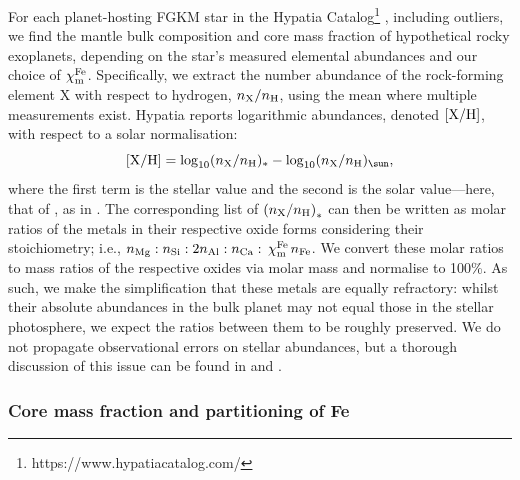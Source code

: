 \documentclass[fleqn,usenatbib]{mnras}
\newcommand{\coreeff}{$\chi^{\rm Fe}_{\rm m}$}
\begin{document}
For each planet-hosting FGKM star in the Hypatia Catalog\footnote{https://www.hypatiacatalog.com/} \citep{hinkel_stellar_2014}, including outliers, we find the mantle bulk composition and core mass fraction of hypothetical rocky exoplanets, depending on the star's measured elemental abundances and our choice of \coreeff. Specifically, we extract the number abundance of the rock-forming element X with respect to hydrogen, $n_{\rm X}/n_{\rm H}$, using the mean where multiple measurements exist. Hypatia reports logarithmic abundances, denoted ${\rm [X/H]}$, with respect to a solar normalisation:
\begin{equation}
    {\rm [X/H]} = \log_{10}(n_{\rm X}/n_{\rm H})_* - \log_{10}(n_{\rm X}/n_{\rm H})_{\sun},
\end{equation}
where the first term is the stellar value and the second is the solar value---here, that of \citet{lodders_abundances_2009}, as in \citet{hinkel_starplanet_2018}. The corresponding list of $\left(n_{\rm X}/n_{\rm H}\right)_*$ can then be written as molar ratios of the metals in their respective oxide forms considering their stoichiometry; i.e., $n_{\rm Mg}:n_{\rm Si}:2n_{\rm Al}:n_{\rm Ca}:$ \coreeff$n_{\rm Fe}$. We convert these molar ratios to mass ratios of the respective oxides via molar mass and normalise to 100\%. As such, we make the simplification that these metals are equally refractory: whilst their absolute abundances in the bulk planet may not equal those in the stellar photosphere, we expect the ratios between them to be roughly preserved.  We do not propagate observational errors on stellar abundances, but a thorough discussion of this issue can be found in \citet{hinkel_starplanet_2018} and \citet{hinkel_concise_2022}.

\subsubsection{Core mass fraction and partitioning of Fe}
\end{document}
